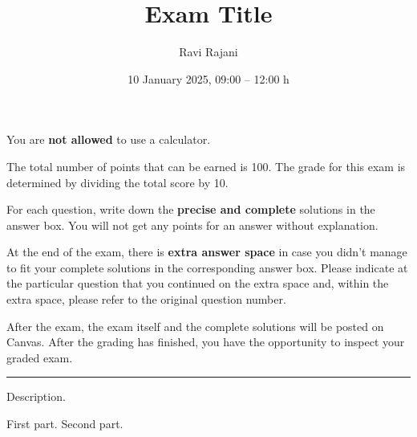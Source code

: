 \documentclass{exam}
\title{Exam Title}
\author{Ravi Rajani}
\date{10 January 2025, 09:00 -- 12:00 h}
\begin{document}
\maketitle
\begin{instructions}
    \item You are \textbf{not allowed} to use a calculator.

    \item The total number of points that can be earned is 100. The grade for this exam is determined by dividing the total score by 10.

    \item For each question, write down the \textbf{precise and complete} solutions in the answer box. You will not get any points for an answer without explanation.

    \item At the end of the exam, there is \textbf{extra answer space} in case you didn't manage to fit your complete solutions in the corresponding answer box. Please indicate at the particular question that you continued on the extra space and, within the extra space, please refer to the original question number.

    \item After the exam, the exam itself and the complete solutions will be posted on Canvas. After the grading has finished, you have the opportunity to inspect your graded exam. 
\end{instructions}
\hrule
\begin{question}[8]
    Description.
    \begin{parts}
         First part.
         Second part.
    \end{parts}
\end{question}
\end{document}
